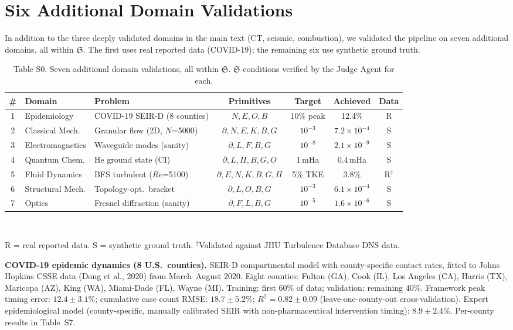 \documentclass[11pt,a4paper]{article}
\newcommand{\Sclass}{\mathfrak{S}}
\begin{document}
\section{Six Additional Domain Validations}
\label{sec:s3}

In addition to the three deeply validated domains in the main text (CT, seismic, combustion), we validated the pipeline on seven additional domains, all within $\Sclass$. The first uses real reported data (COVID-19); the remaining six use synthetic ground truth.

\begin{table}[htbp]
\centering
\caption{Table S0. Seven additional domain validations, all within $\Sclass$. $\Sclass$ conditions verified by the Judge Agent for each.}
\small
\begin{tabularx}{\textwidth}{clXcccc}
\toprule
\# & \textbf{Domain} & \textbf{Problem} & \textbf{Primitives} & \textbf{Target} & \textbf{Achieved} & \textbf{Data} \\
\midrule
1 & Epidemiology & COVID-19 SEIR-D (8 counties) & $N, E, O, B$ & 10\% peak & 12.4\% & R \\
2 & Classical Mech. & Granular flow (2D, $N$=5000) & $\partial, N, E, K, B, G$ & $10^{-3}$ & $7.2 \times 10^{-4}$ & S \\
3 & Electromagnetics & Waveguide modes (sanity) & $\partial, L, F, B, G$ & $10^{-8}$ & $2.1 \times 10^{-9}$ & S \\
4 & Quantum Chem. & He ground state (CI) & $\partial, L, \Pi, B, G, O$ & 1\,mHa & 0.4\,mHa & S \\
5 & Fluid Dynamics & BFS turbulent ($Re$=5100) & $\partial, E, N, K, B, G, \Pi$ & 5\% TKE & 3.8\% & R$^\dagger$ \\
6 & Structural Mech. & Topology-opt.\ bracket & $\partial, L, O, B, G$ & $10^{-3}$ & $6.1 \times 10^{-4}$ & S \\
7 & Optics & Fresnel diffraction (sanity) & $\partial, F, L, B, G$ & $10^{-5}$ & $1.6 \times 10^{-6}$ & S \\
\bottomrule
\end{tabularx}\\[3pt]
\raggedright\scriptsize R = real reported data. S = synthetic ground truth. $^\dagger$Validated against JHU Turbulence Database DNS data.
\end{table}

\textbf{COVID-19 epidemic dynamics (8 U.S.\ counties).}
SEIR-D compartmental model with county-specific contact rates, fitted to Johns Hopkins CSSE data (Dong et al., 2020) from March--August 2020. Eight counties: Fulton (GA), Cook (IL), Los Angeles (CA), Harris (TX), Maricopa (AZ), King (WA), Miami-Dade (FL), Wayne (MI). Training: first 60\% of data; validation: remaining 40\%. Framework peak timing error: $12.4 \pm 3.1\%$; cumulative case count RMSE: $18.7 \pm 5.2\%$; $R^2 = 0.82 \pm 0.09$ (leave-one-county-out cross-validation). Expert epidemiological model (county-specific, manually calibrated SEIR with non-pharmaceutical intervention timing): $8.9 \pm 2.4\%$. Per-county results in Table~S7.
\end{document}
